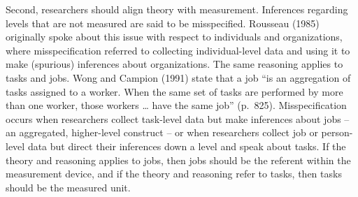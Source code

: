 \documentclass[english,,man]{apa6}
\theoremstyle{definition}
\theoremstyle{definition}
\theoremstyle{definition}
\theoremstyle{remark}
\begin{document}
Second, researchers should align theory with measurement. Inferences
regarding levels that are not measured are said to be misspecified.
Rousseau (1985) originally spoke about this issue with respect to
individuals and organizations, where misspecification referred to
collecting individual-level data and using it to make (spurious)
inferences about organizations. The same reasoning applies to tasks and
jobs. Wong and Campion (1991) state that a job \enquote{is an
aggregation of tasks assigned to a worker. When the same set of tasks
are performed by more than one worker, those workers \ldots{} have the
same job} (p.~825). Misspecification occurs when researchers collect
task-level data but make inferences about jobs -- an aggregated,
higher-level construct -- or when researchers collect job or
person-level data but direct their inferences down a level and speak
about tasks. If the theory and reasoning applies to jobs, then jobs
should be the referent within the measurement device, and if the theory
and reasoning refer to tasks, then tasks should be the measured unit.
\end{document}
